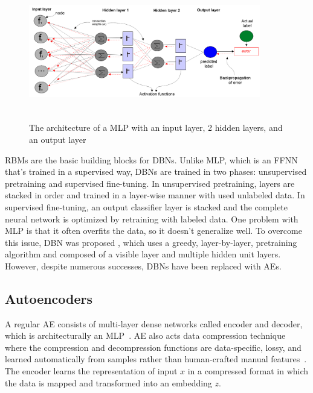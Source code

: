 \begin{figure}[h]
    \centering
    \includegraphics[width=0.9\textwidth,height=60mm]{images/ffnn_1.png}
    \caption{The architecture of a MLP with an input layer, 2 hidden layers, and an output layer}
    \label{fig:mlp_1}
\end{figure}

\hspace*{3.5mm} RBMs are the basic building blocks for DBNs. Unlike MLP, which is an FFNN that's trained in a supervised way, DBNs are trained in two phases: unsupervised pretraining and supervised fine-tuning. In unsupervised pretraining, layers are stacked in order and trained in a layer-wise manner with used unlabeled data. In supervised fine-tuning, an output classifier layer is stacked and the complete neural network is optimized by retraining with labeled data. One problem with MLP is that it often overfits the data, so it doesn't generalize well. To overcome this issue, DBN was proposed , which uses a greedy, layer-by-layer, pretraining algorithm and composed of a visible layer and multiple hidden unit layers. However, despite numerous successes, DBNs have been replaced with AEs. 

\subsection{Autoencoders}
\label{preli:AEs}
A regular AE consists of multi-layer dense networks called encoder and decoder, which is architecturally an MLP~\cite{karimDLTF2018}. AE also acts data compression technique where the compression and decompression functions are data-specific, lossy, and learned automatically from samples rather than human-crafted manual features~\cite{karimDLTF2018}. The encoder learns the representation of input $x$ in a compressed format in which the data is mapped and transformed into an embedding $z$.  

